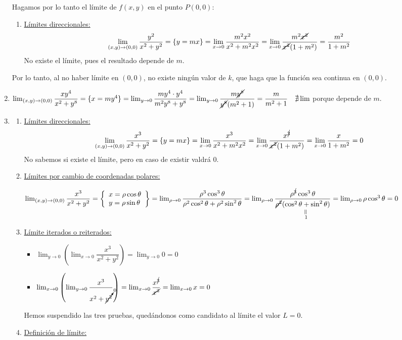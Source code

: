 \begin{enumerate}[label=\color{red}\textbf{\arabic*)}, leftmargin=*]
		Hagamos por lo tanto el límite de $f(x,y)$ en el punto $P(0,0)$:
		\begin{enumerate}[label=\arabic*)]
			\item \underline{Límites direccionales:} \[ \lim_{(x,y)\to(0,0)}\dfrac{y^2}{x^2+y^2}=\{y=mx\}=\lim_{x\to0}\dfrac{m^2x^2}{x^2+m^2x^2}=\lim_{x\to0}\dfrac{m^2\cancel{x^2}}{\cancel{x^2}(1+m^2)}=\dfrac{m^2}{1+m^2} \]No existe el límite, pues el resultado depende de $m$.
		\end{enumerate}
		Por lo tanto, al no haber límite en $(0,0)$, no existe ningún valor de $k$, que haga que la función sea continua en $(0,0)$.
		\item {}
		
		$\lim_{(x,y)\to(0,0)}\dfrac{xy^4}{x^2+y^8}=\{x=my^4\}=\lim_{y\to0}\dfrac{my^4\cdot y^4}{m^2y^8+y^8}=\lim_{y\to0}\dfrac{m\cancel{y^8}}{\cancel{y^8}(m^2+1)}=\dfrac{m}{m^2+1}\quad\nexists\lim$ porque depende de $m$.
		\item {}
		\begin{enumerate}[label=\arabic*), leftmargin=*]
			\item \underline{Límites direccionales:} \[ \lim_{(x,y)\to(0,0)}\dfrac{x^3}{x^2+y^2}=\{y=mx\}=\lim_{x\to0}\dfrac{x^3}{x^2+m^2x^2}=\lim_{x\to0}\dfrac{x^{\cancel{3}}}{\cancel{x^2}(1+m^2)}=\lim_{x\to0}\dfrac{x}{1+m^2}=0 \] No sabemos si existe el límite, pero en caso de existir valdrá 0.
			\item \underline{Límites por cambio de coordenadas polares:}
			
			$\lim_{(x,y)\to(0,0)}\dfrac{x^3}{x^2+y^2}=\left\{\begin{array}{l}
			x=\rho\cos\theta\\
			y=\rho\sin\theta
			\end{array}\right\}=\lim_{\rho\to0}\dfrac{\rho^3\cos^3\theta}{\rho^2\cos^2\theta+\rho^2\sin^2\theta}=\lim_{\rho\to0}\dfrac{\rho^{\cancel{3}}\cos^3\theta}{\cancel{\rho^2}\underset{\begin{subarray}{c}
			\rotatebox{90}{=}\\
			1
			\end{subarray}}{(\cos^2\theta+\sin^2\theta)}}=\linebreak\lim_{\rho\to0}\rho\cos^3\theta=0$
			\item \underline{Límite iterados o reiterados:}
			\begin{itemize}
			\item $\lim_{y\to0}\left(\lim_{x\to0}\dfrac{x^3}{x^2+y^2}\right)=\lim_{y\to0}0=0$
			\item $\lim_{x\to0}\left(\lim_{y\to0}\dfrac{x^3}{x^2+\cancelto{0}{y^2}}\right)=\lim_{x\to0}\dfrac{x^{\cancel{3}}}{\cancel{x^2}}=\lim_{x\to0}x=0$
			\end{itemize}
			Hemos suspendido las tres pruebas, quedándonos como candidato al límite el valor $L=0$.
			\item \underline{Definición de límite:} 
			

\end{enumerate}
\end{enumerate}
